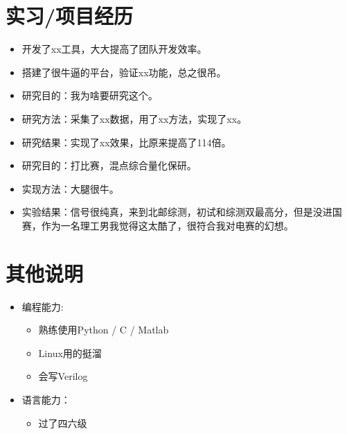 \documentclass{resume}
\begin{document}
\section{\texorpdfstring{\faUsers}{} 实习/项目经历}

\begin{itemize}
  \item 开发了xx工具，大大提高了团队开发效率。
  \item 搭建了很牛逼的平台，验证xx功能，总之很吊。
\end{itemize}

\begin{itemize}
  \item 研究目的：我为啥要研究这个。
  \item 研究方法：采集了xx数据，用了xx方法，实现了xx。
  \item 研究结果：实现了xx效果，比原来提高了114倍。
\end{itemize}

\begin{itemize}
  \item 研究目的：打比赛，混点综合量化保研。
  \item 实现方法：大腿很牛。
  \item 实验结果：信号很纯真，来到北邮综测，初试和综测双最高分，但是没进国赛，作为一名理工男我觉得这太酷了，很符合我对电赛的幻想。
\end{itemize}


\section{\texorpdfstring{\faCogs}{} 其他说明}
\begin{itemize}[parsep=0.5ex]
  \item 编程能力: 
  \begin{itemize}
    \item 熟练使用Python / C / Matlab
    \item Linux用的挺溜
    \item 会写Verilog
  \end{itemize}
  \item 语言能力：
  \begin{itemize}
    \item 过了四六级
  \end{itemize}
\end{itemize}
\end{document}
